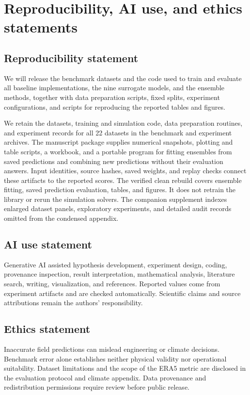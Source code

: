 \section{Reproducibility, AI use, and ethics statements}
\label{app:statements}
\subsection{Reproducibility statement}
We will release the benchmark datasets and the code used to train and evaluate
all baseline implementations, the nine surrogate models, and the ensemble methods,
together with data preparation scripts, fixed splits, experiment configurations,
and scripts for reproducing the reported tables and figures.

We retain the datasets, training and simulation code, data preparation routines,
and experiment records for all 22 datasets in the benchmark and experiment
archives. The manuscript package supplies numerical snapshots, plotting and
table scripts, a workbook, and a portable program for fitting ensembles from
saved predictions and combining new predictions without their evaluation
answers. Input identities, source hashes, saved weights, and replay checks
connect these artifacts to the reported scores. The verified clean rebuild
covers ensemble fitting, saved prediction evaluation, tables, and figures.
It does not retrain the library or rerun the simulation solvers. The companion
supplement indexes enlarged dataset panels, exploratory experiments, and
detailed audit records omitted from the condensed appendix.

\subsection{AI use statement}
Generative AI assisted hypothesis development, experiment design, coding,
provenance inspection, result interpretation, mathematical analysis, literature
search, writing, visualization, and references. Reported values come from
experiment artifacts and are checked automatically. Scientific claims and
source attributions remain the authors' responsibility.

\subsection{Ethics statement}
Inaccurate field predictions can mislead engineering or climate decisions.
Benchmark error alone establishes neither physical validity nor operational
suitability. Dataset limitations and the scope of the ERA5 metric are disclosed
in the evaluation protocol and climate appendix. Data provenance and
redistribution permissions require review before public release.
